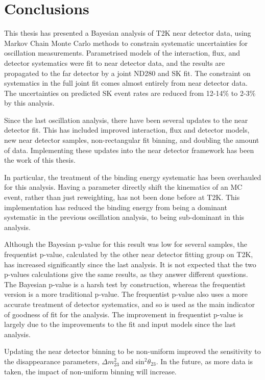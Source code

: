 \chapter{Conclusions}

This thesis has presented a Bayesian analysis of T2K near detector data, using Markov Chain Monte Carlo methods to constrain systematic uncertainties for oscillation measurements. Parametrised models of the interaction, flux, and detector systematics were fit to near detector data, and the results are propagated to the far detector by a joint ND280 and SK fit. The constraint on systematics in the full joint fit comes almost entirely from near detector data. The uncertainties on predicted SK event rates are reduced from 12-14$\%$ to 2-3$\%$ by this analysis. 

Since the last oscillation analysis, there have been several updates to the near detector fit. This has included improved interaction, flux and detector models, new near detector samples, non-rectangular fit binning, and doubling the amount of data. Implementing these updates into the near detector framework has been the work of this thesis.

In particular, the treatment of the binding energy systematic has been overhauled for this analysis. Having a parameter directly shift the kinematics of an MC event, rather than just reweighting, has not been done before at T2K. This implementation has reduced the binding energy from being a dominant systematic in the previous oscillation analysis, to being sub-dominant in this analysis.

Although the Bayesian p-value for this result was low for several samples, the frequentist p-value, calculated by the other near detector fitting group on T2K, has increased significantly since the last analysis. It is not expected that the two p-values calculations give the same results, as they answer different questions. The Bayesian p-value is a harsh test by construction, whereas the frequentist version is a more traditional p-value. The frequentist p-value also uses a more accurate treatment of detector systematics, and so is used as the main indicator of goodness of fit for the analysis. The improvement in frequentist p-value is largely due to the improvements to the fit and input models since the last analysis.

Updating the near detector binning to be non-uniform improved the sensitivity to the disappearance  parameters, $\Delta m^{2}_{23}$ and sin$^2 \theta_{23}$. In the future, as more data is taken, the impact of non-uniform binning will increase.

